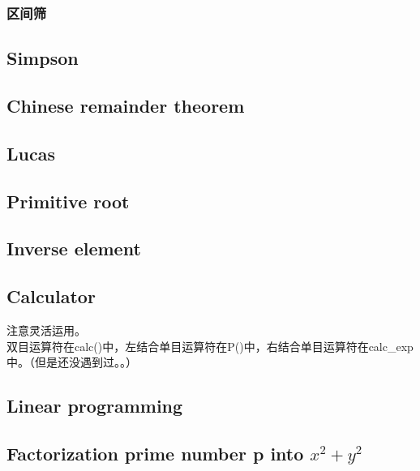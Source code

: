 \subsubsection{区间筛}

\subsection{Simpson}


\subsection{Chinese remainder theorem}


\subsection{Lucas}


\subsection{Primitive root}

\subsection{Inverse element}


\subsection{Calculator}
注意灵活运用。\\
双目运算符在calc()中，左结合单目运算符在P()中，右结合单目运算符在calc\_exp中。（但是还没遇到过。。）\\


\subsection{Linear programming}


\subsection{Factorization prime number p into $x^2+y^2$ }


